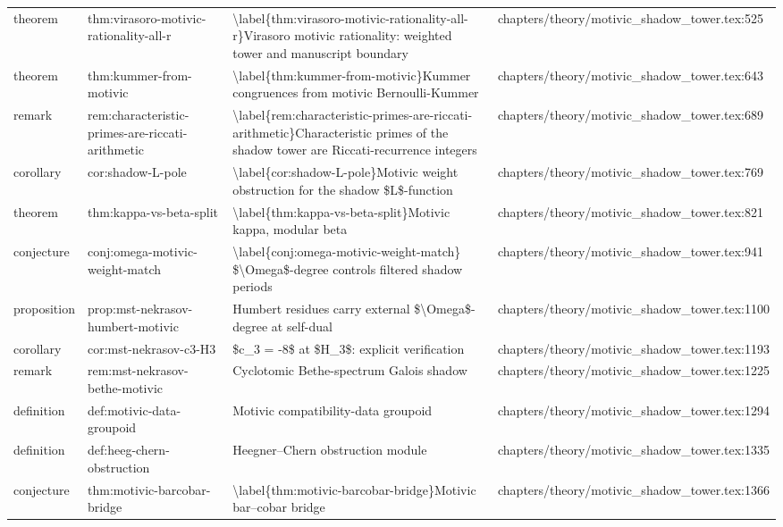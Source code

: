 \documentclass[11pt]{article}
\begin{document}
\begin{longtable}{L{0.10\textwidth}L{0.26\textwidth}L{0.42\textwidth}L{0.22\textwidth}}
theorem & thm:virasoro-motivic-rationality-all-r & \textbackslash{}label\{thm:virasoro-motivic-rationality-all-r\}Virasoro motivic rationality: weighted tower and manuscript boundary & chapters/theory/motivic\_shadow\_tower.tex:525\\
theorem & thm:kummer-from-motivic & \textbackslash{}label\{thm:kummer-from-motivic\}Kummer congruences from motivic Bernoulli-Kummer & chapters/theory/motivic\_shadow\_tower.tex:643\\
remark & rem:characteristic-primes-are-riccati-arithmetic & \textbackslash{}label\{rem:characteristic-primes-are-riccati-arithmetic\}Characteristic primes of the shadow tower are Riccati-recurrence integers & chapters/theory/motivic\_shadow\_tower.tex:689\\
corollary & cor:shadow-L-pole & \textbackslash{}label\{cor:shadow-L-pole\}Motivic weight obstruction for the shadow \$L\$-function & chapters/theory/motivic\_shadow\_tower.tex:769\\
theorem & thm:kappa-vs-beta-split & \textbackslash{}label\{thm:kappa-vs-beta-split\}Motivic kappa, modular beta & chapters/theory/motivic\_shadow\_tower.tex:821\\
conjecture & conj:omega-motivic-weight-match & \textbackslash{}label\{conj:omega-motivic-weight-match\} \$\textbackslash{}Omega\$-degree controls filtered shadow periods & chapters/theory/motivic\_shadow\_tower.tex:941\\
proposition & prop:mst-nekrasov-humbert-motivic & Humbert residues carry external \$\textbackslash{}Omega\$-degree at self-dual & chapters/theory/motivic\_shadow\_tower.tex:1100\\
corollary & cor:mst-nekrasov-c3-H3 & \$c\_3 = -8\$ at \$H\_3\$: explicit verification & chapters/theory/motivic\_shadow\_tower.tex:1193\\
remark & rem:mst-nekrasov-bethe-motivic & Cyclotomic Bethe-spectrum Galois shadow & chapters/theory/motivic\_shadow\_tower.tex:1225\\
definition & def:motivic-data-groupoid & Motivic compatibility-data groupoid & chapters/theory/motivic\_shadow\_tower.tex:1294\\
definition & def:heeg-chern-obstruction & Heegner--Chern obstruction module & chapters/theory/motivic\_shadow\_tower.tex:1335\\
conjecture & thm:motivic-barcobar-bridge & \textbackslash{}label\{thm:motivic-barcobar-bridge\}Motivic bar--cobar bridge & chapters/theory/motivic\_shadow\_tower.tex:1366\\

\end{longtable}
\end{document}

